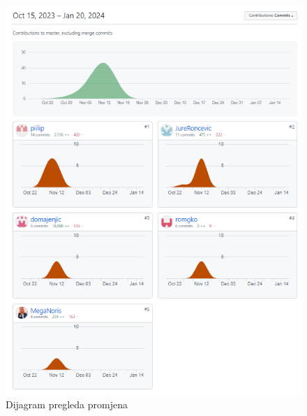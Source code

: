 		\begin{figure}[H]
			\includegraphics[width=\textwidth]{slike/aktivnost.png} %
			\centering
			\caption{Dijagram pregleda promjena}
			\label{fig:dijagramstanja}
		\end{figure}
		
	